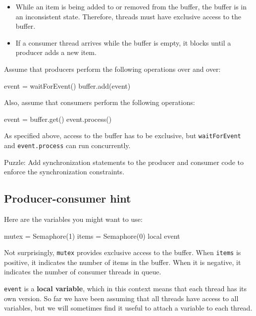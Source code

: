 \documentclass{book}
\begin{document}
\begin{itemize}

    \item While an item is being added to or removed from the buffer,
          the buffer is in an inconsistent state.  Therefore, threads must
          have exclusive access to the buffer.

    \item If a consumer thread arrives while the buffer is empty, it
          blocks until a producer adds a new item.

\end{itemize}

Assume that producers perform the following operations over and
over:

\begin{unbreakable}[title={Basic producer code}]{}
event = waitForEvent()
buffer.add(event)
\end{unbreakable}

Also, assume that consumers perform the following operations:

\begin{unbreakable}[title={Basic consumer code}]{}
event = buffer.get()
event.process()
\end{unbreakable}

As specified above, access to the buffer has to be exclusive,
but {\tt waitForEvent} and {\tt event.process}
can run concurrently.

Puzzle: Add synchronization statements to the producer and
consumer code to enforce the synchronization constraints.



\subsection{Producer-consumer hint}

Here are the variables you might want to use:

\begin{unbreakable}[title={Producer-consumer initialization}]{}
mutex = Semaphore(1)
items = Semaphore(0)
local event
\end{unbreakable}

Not surprisingly, {\tt mutex} provides exclusive access to
the buffer.  When {\tt items} is positive, it indicates the
number of items in the buffer.  When it is negative, it
indicates the number of consumer threads in queue.

    {\tt event} is a {\bf local variable}, which in this context means
that each thread has its own version.
So far we have been assuming that all threads have access
to all variables, but we will sometimes find it useful to
attach a variable to each thread.
\end{document}
